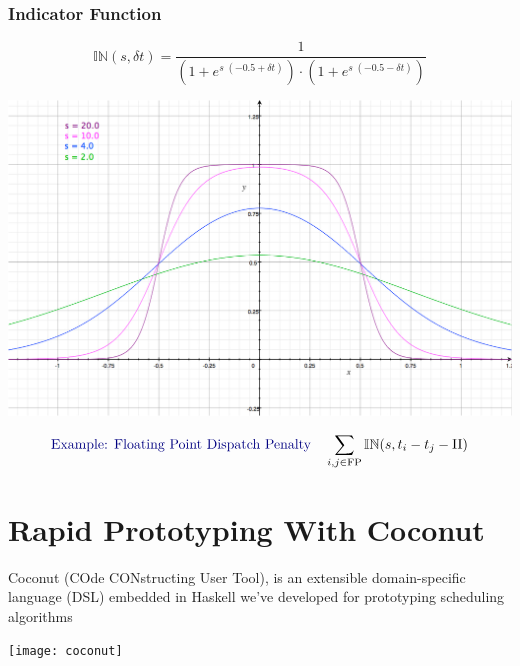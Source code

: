 \documentclass[a0,landscape,24pt]{a0poster}
\begin{document}
\begin{multicols}{3}
\subsubsection*{Indicator Function}

\begin{equation}
\mathbb{IN}(s,\delta t) = \frac{1}{(1 + e^{s \; (-0.5 + \delta t)}) \cdot (1 + e^{s \; (-0.5 - \delta t)})}
\end{equation}

\begin{center}\vspace{1cm}
\includegraphics[width=0.7\linewidth]{sigmoid}
\end{center}\vspace{1cm}

\begin{equation}
\text{\color{Navy} Example: Floating Point Dispatch Penalty} \quad \sum_{i,j \in \text{FP}} \mathbb{IN}(s,t_i - t_j - \textrm{II})
\end{equation}

\color{Navy}
\section*{Rapid Prototyping With Coconut}

Coconut (COde CONstructing User Tool), is an extensible domain-specific language (DSL) embedded in Haskell we've developed for prototyping scheduling algorithms

\begin{center}\vspace{1cm}
\texttt{[image: coconut]}
\end{center}\vspace{1cm}


\end{multicols}
\end{document}
